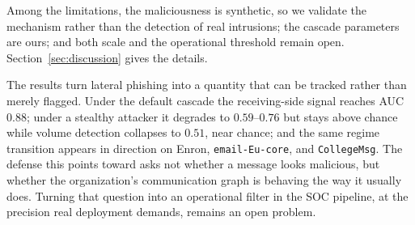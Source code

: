 Among the limitations, the maliciousness is synthetic, so we validate the mechanism rather than the detection
of real intrusions; the cascade parameters are ours; and both scale and the operational threshold remain open.
Section~\ref{sec:discussion} gives the details.

The results turn lateral phishing into a quantity that can be tracked rather than merely flagged. Under the
default cascade the receiving-side signal reaches AUC $0.88$; under a stealthy attacker it degrades to
$0.59$--$0.76$ but stays above chance while volume detection collapses to $0.51$, near chance;
and the same regime transition appears in direction on Enron, \texttt{email-Eu-core}, and
\texttt{CollegeMsg}. The defense this points toward
asks not whether a message looks malicious, but whether the organization's communication graph is behaving
the way it usually does. Turning that question into an operational filter in the SOC pipeline, at the
precision real deployment demands, remains an open problem.
